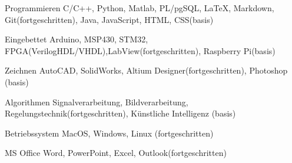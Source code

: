 

\begin{cvskills}

  \cvskill
    {Programmieren} %
    {C/C++, Python, Matlab, PL/pgSQL, \LaTeX, Markdown, Git(fortgeschritten), Java, JavaScript, HTML, CSS(basis)} %

  \cvskill
    {Eingebettet} %
    {Arduino, MSP430, STM32,  FPGA(VerilogHDL/VHDL),LabView(fortgeschritten), Raspberry Pi(basis)} %

  \cvskill
    {Zeichnen} %
    {AutoCAD, SolidWorks, Altium Designer(fortgeschritten), Photoshop (basis)} %

  \cvskill
    {Algorithmen} %
    {Signalverarbeitung, Bildverarbeitung, Regelungstechnik(fortgeschritten), Künstliche Intelligenz (basis)} %

  \cvskill
	{Betriebssystem} %
	{MacOS, Windows, Linux (fortgeschritten)} %

  \cvskill
	{MS Office} %
	{Word, PowerPoint, Excel, Outlook(fortgeschritten)} %


\end{cvskills}
